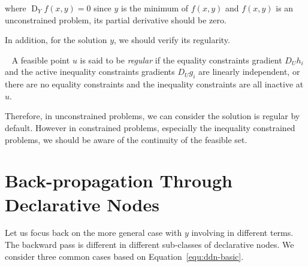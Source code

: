 where $\operatorname{D}_Yf(x,y) = 0$ since $y$ is the minimum of $f(x,y)$ and $f(x,y)$ is an unconstrained problem, its partial derivative should be zero. 
\par In addition, for the solution $y$, we should verify its regularity. 
\begin{defn}~\citep{SG:19}
    \label{defn:regular-point}
    A feasible point $u$ is said to be \emph{regular} if the equality constraints gradient $D_Uh_i$ and the active inequality constraints gradients $D_Ug_i$ are linearly independent, or there are no equality constraints and the inequality constraints are all inactive at $u$.
\end{defn}
Therefore, in unconstrained problems, we can consider the solution is regular by default. However in constrained problems, especially the inequality constrained problems, we should be aware of the continuity of the feasible set.

\section{Back-propagation Through Declarative Nodes}
\label{sec:bp}
Let us focus back on the more general case with $y$ involving in different terms. The backward pass is different in different sub-classes of declarative nodes. We consider three common cases based on Equation~\ref{equ:ddn-basic}. 

